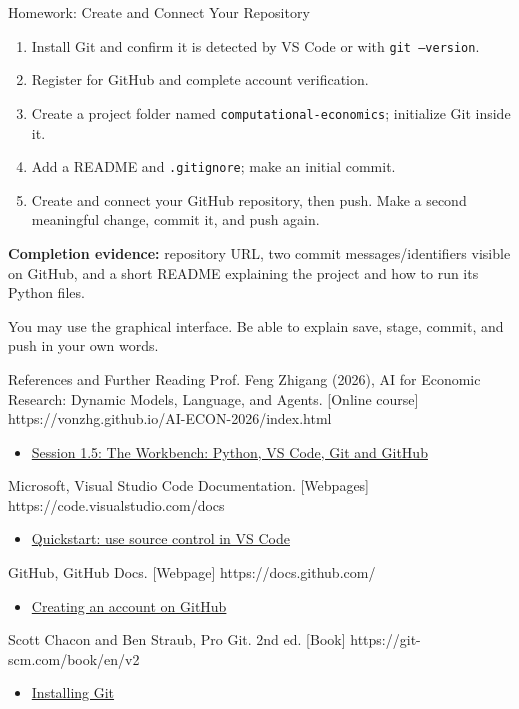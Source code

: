 \begin{frame}{Homework: Create and Connect Your Repository}
\small
\begin{enumerate}
\item Install Git and confirm it is detected by VS Code or with \texttt{git --version}.
\item Register for GitHub and complete account verification.
\item Create a project folder named \texttt{computational-economics}; initialize Git inside it.
\item Add a README and \texttt{.gitignore}; make an initial commit.
\item Create and connect your GitHub repository, then push. Make a second meaningful change, commit it, and push again.
\end{enumerate}
\medskip
\textbf{Completion evidence:} repository URL, two commit messages/identifiers visible on GitHub, and a short README explaining the project and how to run its Python files.
\par You may use the graphical interface. Be able to explain save, stage, commit, and push in your own words.
\end{frame}
\begin{frame}{References and Further Reading}
  {Prof. Feng Zhigang (2026), AI for Economic Research: Dynamic Models, Language, and Agents. [Online course]}
  {https://vonzhg.github.io/AI-ECON-2026/index.html}
  {\begin{itemize}
\item \href{https://vonzhg.github.io/AI-ECON-2026/slides/Session01_Deck5_Workbench_Python_Git_GitHub.pdf}{Session 1.5: The Workbench: Python, VS Code, Git and GitHub}
\end{itemize}}
  {Microsoft, Visual Studio Code Documentation. [Webpages]}
  {https://code.visualstudio.com/docs}
  {\begin{itemize}
\item \href{https://code.visualstudio.com/docs/sourcecontrol/quickstart}{Quickstart: use source control in VS Code}
\end{itemize}}
  {GitHub, GitHub Docs. [Webpage]}
  {https://docs.github.com/}
  {\begin{itemize}
\item \href{https://docs.github.com/en/account-and-profile/how-tos/account-management/creating-an-account-on-github}{Creating an account on GitHub}
\end{itemize}}
  {Scott Chacon and Ben Straub, Pro Git. 2nd ed. [Book]}
  {https://git-scm.com/book/en/v2}
  {\begin{itemize}
\item \href{https://git-scm.com/book/en/v2/Getting-Started-Installing-Git}{Installing Git}
\end{itemize}}
\end{frame}

